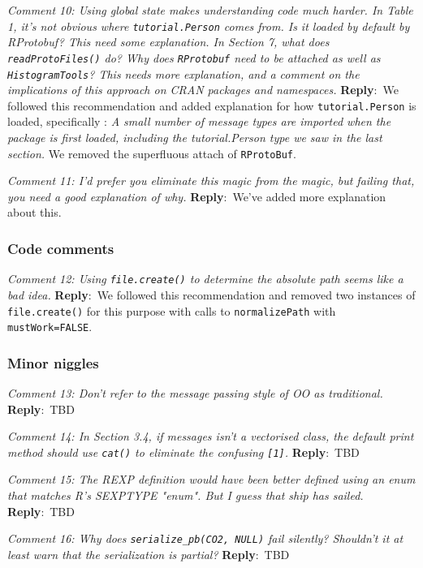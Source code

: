 \documentclass[10pt]{article}
\newcommand{\pointRaised}[2]{\smallskip %
  \textsl{{\fontseries{b}\selectfont #1}: #2}\newline}
\newcommand{\reply}[1]{\textbf{Reply}:\ #1 \smallskip } %
\begin{document}
\pointRaised{Comment 10}{Using global state makes understanding code much harder. In Table 1,
  it's not obvious where \texttt{tutorial.Person} comes from. Is it loaded by
  default by RProtobuf? This need some explanation. In Section 7, what
  does \texttt{readProtoFiles()} do? Why does \texttt{RProtobuf} need to be attached
  as well as \texttt{HistogramTools}? This needs more explanation, and a
  comment on the implications of this approach on CRAN packages and
  namespaces.}
\reply{We followed this recommendation and added explanation for how
\texttt{tutorial.Person} is loaded, specifically : \emph{A small number of message types are imported when the
package is first loaded, including the tutorial.Person type we saw in
the last section.}  We removed the superfluous attach of \texttt{RProtoBuf}.}

\pointRaised{Comment 11}{
  I'd prefer you eliminate this magic from the magic, but failing that,
  you need a good explanation of why.}
\reply{We've added more explanation about this.}

\subsubsection*{Code comments}

\pointRaised{Comment 12}{Using \texttt{file.create()} to determine the absolute path seems like a bad idea.}
\reply{We followed this recommendation and removed two instances of
  \texttt{file.create()} for this purpose with calls to
  \texttt{normalizePath} with \texttt{mustWork=FALSE}.}

\subsubsection*{Minor niggles}

\pointRaised{Comment 13}{Don't refer to the message passing style of OO as traditional.}
\reply{TBD}

\pointRaised{Comment 14}{In Section 3.4, if messages isn't a vectorised class, the default
   print method should use \texttt{cat()} to eliminate the confusing \texttt{[1]}.}
\reply{TBD}

\pointRaised{Comment 15}{The REXP definition would have been better defined using an enum that
   matches R's SEXPTYPE "enum". But I guess that ship has sailed.}
\reply{TBD}

\pointRaised{Comment 16}{Why does \texttt{serialize\_pb(CO2, NULL)} fail silently? Shouldn't it at least
   warn that the serialization is partial?}
\reply{TBD}
\end{document}
